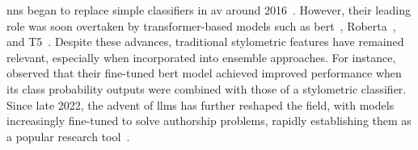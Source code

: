 \acp{nn} began to replace simple classifiers in \ac{av} around 2016~\citep{schmidt_llm_av_latin_24}. 
However, their leading role was soon overtaken by transformer-based models such as \acs{bert}~\citep{bert_2019}, Ro\acs{bert}a~\citep{roberta_2019}, and T5~\citep{t5_2020}. 
Despite these advances, traditional stylometric features have remained relevant, especially when incorporated into ensemble approaches. 
For instance, \citet{bertaa_2020} observed that their fine-tuned \acs{bert} model achieved improved performance when its class probability outputs were combined with those of a stylometric classifier.
Since late 2022, the advent of \acp{llm} has further reshaped the field, with models increasingly fine-tuned to solve authorship problems, rapidly establishing them as a popular research tool~\citep{schmidt_llm_av_latin_24}.
